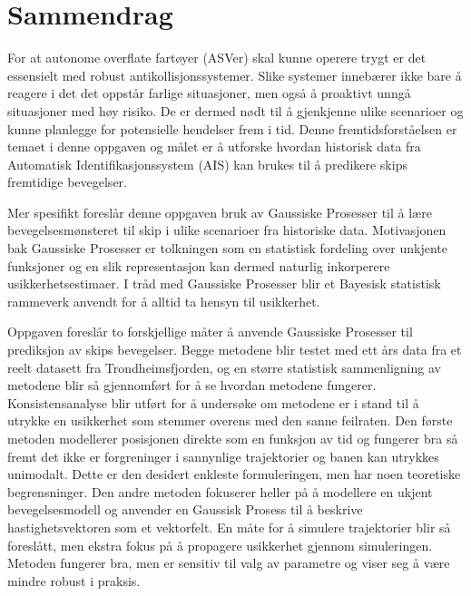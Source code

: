 \chapter*{Sammendrag}
For at autonome overflate fartøyer (ASVer) skal kunne operere trygt er det essensielt med robust antikollisjonssystemer. Slike systemer innebærer ikke bare å reagere i det det oppstår farlige situasjoner, men også å proaktivt unngå situasjoner med høy risiko. De er dermed nødt til å gjenkjenne ulike scenarioer og kunne planlegge for potensielle hendelser frem i tid. Denne fremtidsforståelsen er temaet i denne oppgaven og målet er å utforske hvordan historisk data fra Automatisk Identifikasjonssystem (AIS) kan brukes til å predikere skips fremtidige bevegelser.

Mer spesifikt foreslår denne oppgaven bruk av Gaussiske Prosesser til å lære bevegelsesmønsteret til skip i ulike scenarioer fra historiske data. Motivasjonen bak Gaussiske Prosesser er tolkningen som en statistisk fordeling over unkjente funksjoner og en slik representasjon kan dermed naturlig inkorperere usikkerhetsestimaer. I tråd med Gaussiske Prosesser blir et Bayesisk statistisk rammeverk anvendt for å alltid ta hensyn til usikkerhet.

Oppgaven foreslår to forskjellige måter å anvende Gaussiske Prosesser til prediksjon av skips bevegelser. Begge metodene blir testet med ett års data fra et reelt datasett fra Trondheimsfjorden, og en større statistisk sammenligning av metodene blir så gjennomført for å se hvordan metodene fungerer. Konsistensanalyse blir utført for å undersøke om metodene er i stand til å utrykke en usikkerhet som stemmer overens med den sanne feilraten.  
Den første metoden modellerer posisjonen direkte som en funksjon av tid og fungerer bra så fremt det ikke er forgreninger i sannynlige trajektorier og banen kan utrykkes unimodalt. Dette er den desidert enkleste formuleringen, men har noen teoretiske begrensninger.
Den andre metoden fokuserer heller på å modellere en ukjent bevegelsesmodell og anvender en Gaussisk Prosess til å beskrive hastighetsvektoren som et vektorfelt. En måte for å simulere trajektorier blir så foreslått, men ekstra fokus på å propagere usikkerhet gjennom simuleringen. Metoden fungerer bra, men er sensitiv til valg av parametre og viser seg å være mindre robust i praksis. 







